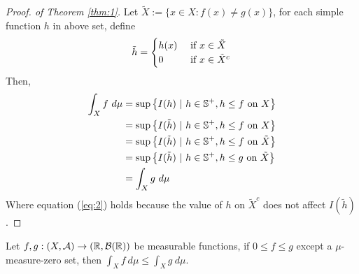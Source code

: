 \documentclass[11pt]{article}
\begin{document}
	\begin{proof}[Proof. of Theorem \ref{thm:1}]
		Let $\tilde{X} := \{x \in X: f(x) \neq g(x)\}$, for each simple function $h$ in above set, define
		\begin{align}
			\tilde{h} = \begin{cases}
				h(x) &\text{{ if }} x \in \tilde{X} \\
				0 &\text{{ if }} x \in \tilde{X}^c
			\end{cases}
		\end{align}
		Then,
		\begin{align}
			\int_X f\ d\mu &= \sup \left \{I(h)\ |\ h \in \mathbb{S}^+, h \leq f \text{{ on }} X \right\} \\
			&= \sup \left \{I(\tilde{h})\ |\ {h} \in \mathbb{S}^+, {h} \leq f \text{{ on }} {X} \right\} \\
			&= \sup \left \{I(\tilde{h})\ |\ {h} \in \mathbb{S}^+, {h} \leq f \text{{ on }} \tilde{X} \right\} \label{eq:2}\\
			&= \sup \left \{I(\tilde{h})\ |\ {h} \in \mathbb{S}^+, {h} \leq g \text{{ on }} \tilde{X} \right\} \\
			&= \int_X g\ d\mu
		\end{align}
		Where equation (\ref{eq:2}) holds because the value of $h$ on $\tilde{X}^c$ does not affect $I(\tilde{h})$.
	\end{proof}

	\begin{theorem}
		Let $f, g: (X, \mathcal{{A}}) \to (\mathbb{R}, \mathcal{{B}}(\mathbb{R}))$ be measurable functions, if $0 \leq f \leq g$ except a $\mu$-measure-zero set, then $\int_X f\ d\mu \leq \int_X g\ d\mu$.
	\end{theorem}
	
\end{document}
